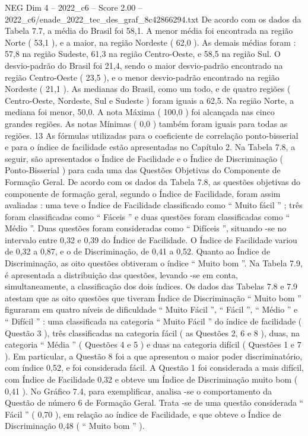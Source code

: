\begin{textsample}{NEG Dim 4 – 2022\_c6 – Score 2.00 – 2022\_c6/enade\_2022\_tec\_des\_graf\_8c42866294.txt}
De acordo com os dados da Tabela 7.7, a média do Brasil foi 58,1.
A menor média foi encontrada na região Norte ( 53,1 ), e a maior, na região Nordeste ( 62,0 ).
As demais médias foram : 57,8 na região Sudeste, 61,3 na região Centro-Oeste, e 58,5 na região Sul.
O desvio-padrão do Brasil foi 21,4, sendo o maior desvio-padrão encontrado na região Centro-Oeste ( 23,5 ), e o menor desvio-padrão encontrado na região Nordeste ( 21,1 ).
As medianas do Brasil, como um todo, e de quatro regiões ( Centro-Oeste, Nordeste, Sul e Sudeste ) foram iguais a 62,5.
Na região Norte, a mediana foi menor, 50,0.
A nota Máxima ( 100,0 ) foi alcançada nas cinco grandes regiões.
As notas Mínimas ( 0,0 ) também foram iguais para todas as regiões. 13 As fórmulas utilizadas para o coeficiente de correlação ponto-bisserial e para o índice de facilidade estão apresentadas no Capítulo 2.
Na Tabela 7.8, a seguir, são apresentados o Índice de Facilidade e o Índice de Discriminação ( Ponto-Bisserial ) para cada uma das Questões Objetivas do Componente de Formação Geral.
De acordo com os dados da Tabela 7.8, as questões objetivas do componente de formação geral, segundo o Índice de Facilidade, foram assim avaliadas : uma teve o Índice de Facilidade classificado como “ Muito fácil ” ; três foram classificadas como “ Fáceis ” e duas questões foram classificadas como “ Médio ”.
Duas questões foram consideradas como “ Difíceis ”, situando -se no intervalo entre 0,32 e 0,39 do Índice de Facilidade.
O Índice de Facilidade variou de 0,32 a 0,87, e o de Discriminação, de 0,41 a 0,52.
Quanto ao Índice de Discriminação, as oito questões obtiveram o índice “ Muito bom ”.
Na Tabela 7.9, é apresentada a distribuição das questões, levando -se em conta, simultaneamente, a classificação dos dois índices.
Os dados das Tabelas 7.8 e 7.9 atestam que as oito questões que tiveram Índice de Discriminação “ Muito bom ” figuraram em quatro níveis de dificuldade “ Muito Fácil ”, “ Fácil ”, “ Médio ” e “ Difícil ” : uma classificada na categoria “ Muito Fácil ” do índice de facilidade ( Questão 3 ), três classificadas na categoria fácil ( as Questões 2, 6 e 8 ), duas, na categoria “ Média ” ( Questões 4 e 5 ) e duas na categoria difícil ( Questões 1 e 7 ).
Em particular, a Questão 8 foi a que apresentou o maior poder discriminatório, com índice 0,52, e foi considerada fácil.
A Questão 1 foi considerada a mais difícil, com Índice de Facilidade 0,32 e obteve um Índice de Discriminação muito bom ( 0,41 ).
No Gráfico 7.4, para exemplificar, analisa -se o comportamento da Questão de número 6 de Formação Geral.
Trata -se de uma questão considerada “ Fácil ” ( 0,70 ), em relação ao índice de Facilidade, e que obteve o Índice de Discriminação 0,48 ( “ Muito bom ” ).

\end{textsample}
